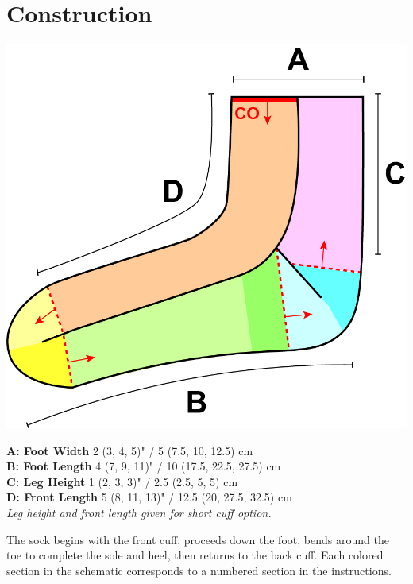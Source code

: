 \documentclass[12pt]{article}
\begin{document}
\section*{Construction}
\small \begin{multicols}{2}
\includegraphics[width=.9\linewidth]{TABAschematic.png}
\columnbreak 
\begin{addmargin}[-2em]{0em}
{\normalsize\textbf{\textsf{A: Foot Width}}} \hspace{.5em} 2 (3, 4, 5)" / 5 (7.5, 10, 12.5) cm \\

{\normalsize\textbf{\textsf{B: Foot Length}}} \hspace{.5em} 4 (7, 9, 11)" / 10 (17.5, 22.5, 27.5) cm \\

{\normalsize\textbf{\textsf{C: Leg Height}}} \hspace{.5em} 1 (2, 3, 3)" / 2.5 (2.5, 5, 5) cm \\

{\normalsize\textbf{\textsf{D: Front Length}}} 5 (8, 11, 13)"  / 12.5 (20, 27.5, 32.5) cm \\

\emph{Leg height and front length given for short cuff option.}

The sock begins with the front cuff, proceeds down the foot, bends around the toe to complete the sole and heel, then returns to the back cuff. Each colored section in the schematic corresponds to a numbered section in the instructions.
\end{addmargin}
\end{multicols}
\end{document}
